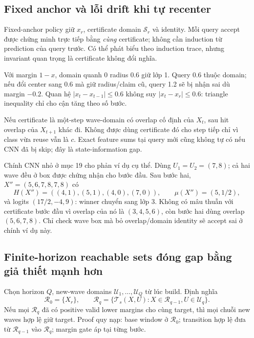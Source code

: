 \documentclass[11pt,a4paper]{article}
\newcommand{\Sset}{\mathcal S}
\newcommand{\Uset}{\mathcal U}
\theoremstyle{definition}
\begin{document}
\subsection{Fixed anchor và lỗi drift khi tự recenter}
Fixed-anchor policy giữ $x_r$, certificate domain $\Sset_r$ và identity.
Mỗi query accept được chứng minh trực tiếp bằng \emph{cùng} certificate;
không cần induction từ prediction của query trước. Có thể phát biểu theo
induction trace, nhưng invariant quan trọng là certificate không đổi nghĩa.

Với margin $1-x$, domain quanh 0 radius 0.6 giữ lớp 1. Query 0.6 thuộc
domain; nếu đổi center sang 0.6 mà giữ radius/claim cũ, query 1.2 sẽ bị
nhận sai dù margin $-0.2$. Quan hệ $|x_t-x_{t-1}|\le0.6$ không suy
$|x_t-x_r|\le0.6$: triangle inequality chỉ cho cận tăng theo số bước.

Nếu certificate là một-step wave-domain có overlap cố định của $X_t$,
sau hit overlap của $X_{t+1}$ khác đi. Không được dùng certificate đó cho
step tiếp chỉ vì class vừa reuse vẫn là $c$. Exact feature sums tại query
mới cũng không tự có nếu CNN đã bị skip; đây là state-information gap.

Chính CNN nhỏ ở mục 19 cho phản ví dụ cụ thể. Dùng $U_1=U_2=(7,8)$;
cả hai wave đều ở box được chứng nhận cho bước đầu. Sau bước hai,
$X''=(5,6,7,8,7,8)$ có
\begin{equation}
H(X'')=((4,1),(5,1),(4,0),(7,0)),\qquad\mu(X'')=(5,1/2),
\end{equation}
và logits $(17/2,-4,9)$: winner chuyển sang lớp 3. Không có mâu thuẫn
với certificate bước đầu vì overlap của nó là $(3,4,5,6)$, còn bước hai
dùng overlap $(5,6,7,8)$. Chỉ check wave box mà bỏ overlap/domain identity
sẽ accept sai ở chính ví dụ này.

\subsection{Finite-horizon reachable sets đóng gap bằng giả thiết mạnh hơn}
Chọn horizon $Q$, new-wave domains $\Uset_1,\ldots,\Uset_Q$ từ lúc build.
Định nghĩa
\begin{equation}
\mathcal R_0=\{X_r\},\qquad
\mathcal R_q=\{\mathcal T_s(X,U):X\in\mathcal R_{q-1},U\in\Uset_q\}.
\end{equation}
Nếu mọi $\mathcal R_q$ đã có positive valid lower margins cho cùng target,
thì mọi chuỗi new waves hợp lệ giữ target. Proof quy nạp: base window ở
$\mathcal R_0$; transition hợp lệ đưa từ $\mathcal R_{q-1}$ vào
$\mathcal R_q$; margin gate áp tại từng bước.
\end{document}
